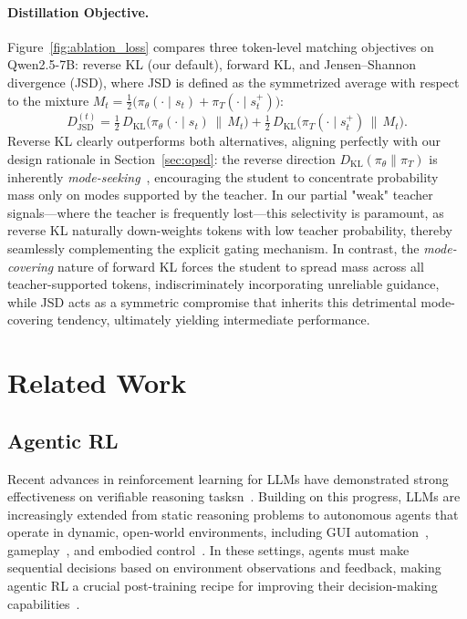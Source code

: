 \documentclass{article} %
\begin{document}
\paragraph{Distillation Objective.} Figure~\ref{fig:ablation_loss} compares three token-level matching objectives on Qwen2.5-7B: reverse KL (our default), forward KL, and Jensen--Shannon divergence (JSD), where JSD is defined as the symmetrized average with respect to the mixture $M_t = \tfrac{1}{2}\bigl(\pi_{\theta}(\cdot\mid s_t) + \pi_T(\cdot\mid s_t^{+})\bigr)$: $$ D_{\mathrm{JSD}}^{(t)} = \tfrac{1}{2}\,D_{\mathrm{KL}}\!\bigl(\pi_{\theta}(\cdot\mid s_t)\,\|\,M_t\bigr) + \tfrac{1}{2}\,D_{\mathrm{KL}}\!\bigl(\pi_T(\cdot\mid s_t^{+})\,\|\,M_t\bigr). $$ Reverse KL clearly outperforms both alternatives, aligning perfectly with our design rationale in Section~\ref{sec:opsd}: the reverse direction $D_{\mathrm{KL}}(\pi_{\theta}\|\pi_T)$ is inherently \emph{mode-seeking}~\citep{murphy2012machine}, encouraging the student to concentrate probability mass only on modes supported by the teacher. In our partial "weak" teacher signals---where the teacher is frequently lost---this selectivity is paramount, as reverse KL naturally down-weights tokens with low teacher probability, thereby seamlessly complementing the explicit gating mechanism. In contrast, the \emph{mode-covering} nature of forward KL forces the student to spread mass across all teacher-supported tokens, indiscriminately incorporating unreliable guidance, while JSD acts as a symmetric compromise that inherits this detrimental mode-covering tendency, ultimately yielding intermediate performance.

\section{Related Work}

\subsection{Agentic RL}

Recent advances in reinforcement learning for LLMs have demonstrated strong effectiveness on verifiable reasoning tasksn~\citep{shao2024deepseekmath,yu2025dapo,guo2025ds-r1,yao2026coba,chen2026learning}. 
Building on this progress, LLMs are increasingly extended from static reasoning problems to autonomous agents that operate in dynamic, open-world environments, including GUI automation~\citep{ye2025mobileagentv3}, gameplay~\citep{shridhar2020alfworld}, and embodied control~\citep{wang2023voyager}. 
In these settings, agents must make sequential decisions based on environment observations and feedback, making agentic RL a crucial post-training recipe for improving their decision-making capabilities~\citep{lu2025uis1,dong2025arpo,feng2025gigpo,lu2026uir1,lu2026uicopilot,shi2026skill1}.
\end{document}
